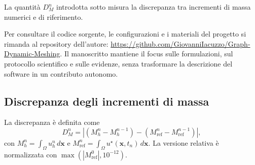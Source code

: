 La quantità $D_M^n$ introdotta sotto misura la discrepanza tra incrementi di massa numerici e di riferimento.

Per consultare il codice sorgente, le configurazioni e i materiali del progetto si rimanda al repository dell'autore: \url{https://github.com/GiovanniIacuzzo/Graph-Dynamic-Meshing}. Il manoscritto mantiene il focus sulle formulazioni, sul protocollo scientifico e sulle evidenze, senza trasformare la descrizione del software in un contributo autonomo.

\subsection{Discrepanza degli incrementi di massa}
La discrepanza è definita come
\begin{equation}
D_M^n=\left|(M_h^n-M_h^{n-1})-(M_{\mathrm{ref}}^n-M_{\mathrm{ref}}^{n-1})\right|,
\label{eq:mass_increment_discrepancy}
\end{equation}
con $M_h^n=\int_\Omega u_h^n\,d\bm x$ e $M_{\mathrm{ref}}^n=\int_\Omega u^\star(\bm x,t_n)\,d\bm x$. La versione relativa è normalizzata con $\max(|M_{\mathrm{ref}}^0|,10^{-12})$.
